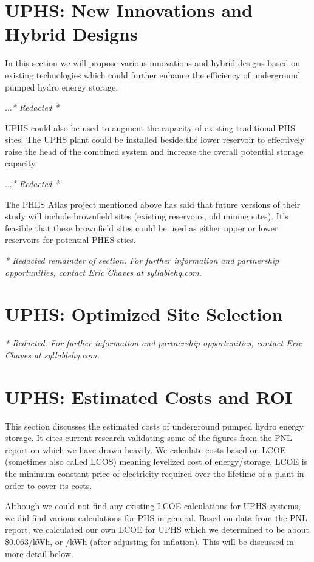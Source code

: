 \documentclass[hidelinks,12pt,a4paper]{article}
\begin{document}
\pagebreak[4]
\section{UPHS: New Innovations and Hybrid Designs}
In this section we will propose various innovations and hybrid designs based on existing technologies which could further enhance the efficiency of underground pumped hydro energy storage.

...\textit{* Redacted *}

UPHS could also be used to augment the capacity of existing traditional PHS sites. The UPHS plant could be installed beside the lower reservoir to effectively raise the head of the combined system and increase the overall potential storage capacity.

...\textit{* Redacted *}

The PHES Atlas project mentioned above has said that future versions of their study will include brownfield sites (existing reservoirs, old mining sites). It's feasible that these brownfield sites could be used as either upper or lower reservoirs for potential PHES sties.

\textit{* Redacted remainder of section. For further information and partnership opportunities, contact Eric Chaves at syllablehq.com.}

\pagebreak[3]
\section{UPHS: Optimized Site Selection}

\textit{* Redacted. For further information and partnership opportunities, contact Eric Chaves at syllablehq.com.}


\pagebreak[4]
\section{UPHS: Estimated Costs and ROI}
This section discusses the estimated costs of underground pumped hydro energy storage. It cites current research validating some of the figures from the PNL report on which we have drawn heavily. We calculate costs based on LCOE (sometimes also called LCOS) meaning levelized cost of energy/storage. LCOE is the minimum constant price of electricity required over the lifetime of a plant in order to cover its costs.

Although we could not find any existing LCOE calculations for UPHS systems, we did find various calculations for PHS in general. Based on data from the PNL report, we calculated our own LCOE for UPHS  which we determined to be about \$0.063/kWh, or /kWh (after adjusting for inflation). This will be discussed in more detail below.
\end{document}
